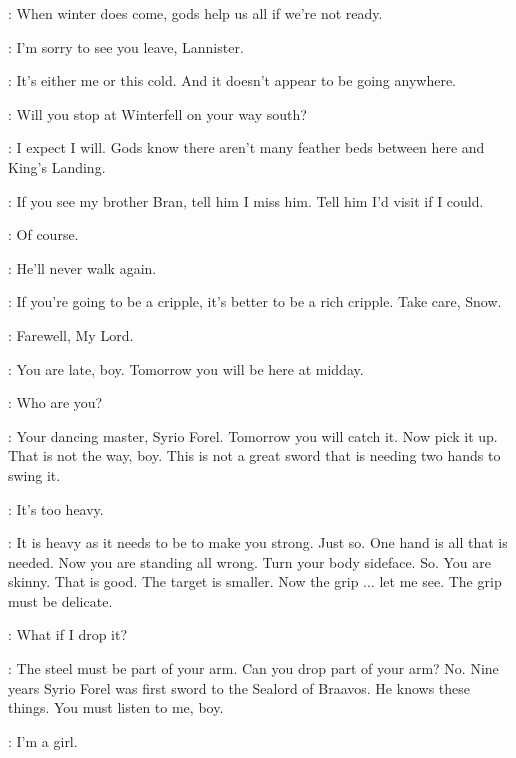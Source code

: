 \AEMON: When winter does come, gods help us all if we're not ready. 


\JON: I'm sorry to see you leave, Lannister. 

\TYRION: It's either me or this cold. And it doesn't appear to be going anywhere. 

\JON: Will you stop at Winterfell on your way south? 

\TYRION: I expect I will. Gods know there aren't many feather beds between here and King's Landing. 

\JON: If you see my brother Bran, tell him I miss him. Tell him I'd visit if I could. 

\TYRION: Of course. 

\JON: He'll never walk again. 

\TYRION: If you're going to be a cripple, it's better to be a rich cripple. Take care, Snow. 

\JON: Farewell, My Lord. 


\scene



\SYRIO: You are late, boy. Tomorrow you will be here at midday. 

\ARYA: Who are you? 

\SYRIO: Your dancing master, Syrio Forel.  Tomorrow you will catch it. Now pick it up.  That is not the way, boy. This is not a great sword that is needing two hands to swing it. 

\ARYA: It's too heavy. 

\SYRIO: It is heavy as it needs to be to make you strong. Just so. One hand is all that is needed. Now you are standing all wrong. Turn your body sideface. So. You are skinny. That is good. The target is smaller. Now the grip $\ldots$ let me see. The grip must be delicate. 

\ARYA: What if I drop it? 

\SYRIO: The steel must be part of your arm. Can you drop part of your arm? No. Nine years Syrio Forel was first sword to the Sealord of Braavos. He knows these things. You must listen to me, boy. 

\ARYA: I'm a girl. 

